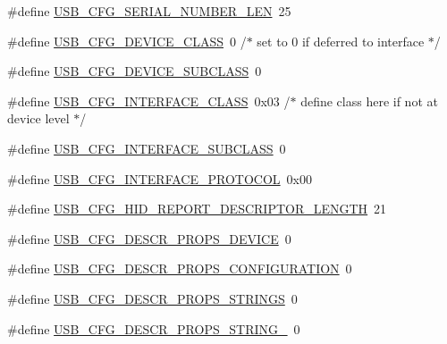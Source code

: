 \begin{DoxyCompactItemize}
\item 
\#define \hyperlink{mhvlib-_vusb-_console_2vusb_2usbconfig_8h_a641423b56d832e5d8aff852390591aa0}{U\-S\-B\-\_\-\-C\-F\-G\-\_\-\-S\-E\-R\-I\-A\-L\-\_\-\-N\-U\-M\-B\-E\-R\-\_\-\-L\-E\-N}~25
\item 
\#define \hyperlink{mhvlib-_vusb-_console_2vusb_2usbconfig_8h_a9ce4f96ad98b3db8205691e8bc723e55}{U\-S\-B\-\_\-\-C\-F\-G\-\_\-\-D\-E\-V\-I\-C\-E\-\_\-\-C\-L\-A\-S\-S}~0    /$\ast$ set to 0 if deferred to interface $\ast$/
\item 
\#define \hyperlink{mhvlib-_vusb-_console_2vusb_2usbconfig_8h_a89e5ad66f8b835866e7d836c73bfd30d}{U\-S\-B\-\_\-\-C\-F\-G\-\_\-\-D\-E\-V\-I\-C\-E\-\_\-\-S\-U\-B\-C\-L\-A\-S\-S}~0
\item 
\#define \hyperlink{mhvlib-_vusb-_console_2vusb_2usbconfig_8h_a34f6fe9486b66e8220a82a0eb87a7447}{U\-S\-B\-\_\-\-C\-F\-G\-\_\-\-I\-N\-T\-E\-R\-F\-A\-C\-E\-\_\-\-C\-L\-A\-S\-S}~0x03   /$\ast$ define class here if not at device level $\ast$/
\item 
\#define \hyperlink{mhvlib-_vusb-_console_2vusb_2usbconfig_8h_ac643f27afa43062c19b8f0674b6be1b5}{U\-S\-B\-\_\-\-C\-F\-G\-\_\-\-I\-N\-T\-E\-R\-F\-A\-C\-E\-\_\-\-S\-U\-B\-C\-L\-A\-S\-S}~0
\item 
\#define \hyperlink{mhvlib-_vusb-_console_2vusb_2usbconfig_8h_a8ddab89b764bfd88d024c7d9c9931de3}{U\-S\-B\-\_\-\-C\-F\-G\-\_\-\-I\-N\-T\-E\-R\-F\-A\-C\-E\-\_\-\-P\-R\-O\-T\-O\-C\-O\-L}~0x00
\item 
\#define \hyperlink{mhvlib-_vusb-_console_2vusb_2usbconfig_8h_a47d9bef5c10a1b9ba917eca583d2abc9}{U\-S\-B\-\_\-\-C\-F\-G\-\_\-\-H\-I\-D\-\_\-\-R\-E\-P\-O\-R\-T\-\_\-\-D\-E\-S\-C\-R\-I\-P\-T\-O\-R\-\_\-\-L\-E\-N\-G\-T\-H}~21
\item 
\#define \hyperlink{mhvlib-_vusb-_console_2vusb_2usbconfig_8h_aa916bf33f6f8f481a219d0a81b5b225e}{U\-S\-B\-\_\-\-C\-F\-G\-\_\-\-D\-E\-S\-C\-R\-\_\-\-P\-R\-O\-P\-S\-\_\-\-D\-E\-V\-I\-C\-E}~0
\item 
\#define \hyperlink{mhvlib-_vusb-_console_2vusb_2usbconfig_8h_a8aae9f682ca9f91faae0453e4351a50b}{U\-S\-B\-\_\-\-C\-F\-G\-\_\-\-D\-E\-S\-C\-R\-\_\-\-P\-R\-O\-P\-S\-\_\-\-C\-O\-N\-F\-I\-G\-U\-R\-A\-T\-I\-O\-N}~0
\item 
\#define \hyperlink{mhvlib-_vusb-_console_2vusb_2usbconfig_8h_a750fb6cc3e8eafaddae659af97f6f737}{U\-S\-B\-\_\-\-C\-F\-G\-\_\-\-D\-E\-S\-C\-R\-\_\-\-P\-R\-O\-P\-S\-\_\-\-S\-T\-R\-I\-N\-G\-S}~0
\item 
\#define \hyperlink{mhvlib-_vusb-_console_2vusb_2usbconfig_8h_a9c0556a4c6c5a1ab8f6598aee8e5bf6a}{U\-S\-B\-\_\-\-C\-F\-G\-\_\-\-D\-E\-S\-C\-R\-\_\-\-P\-R\-O\-P\-S\-\_\-\-S\-T\-R\-I\-N\-G\-\_}~0

\end{DoxyCompactItemize}
